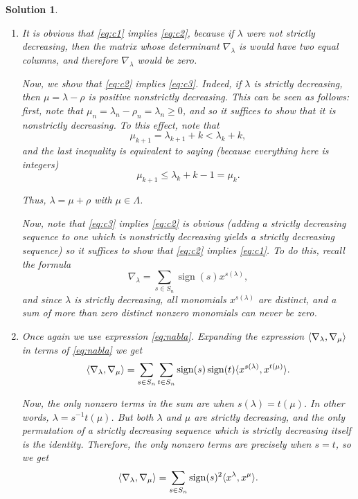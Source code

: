 \documentclass{article}
\theoremstyle{nonumberplain}
\newtheorem{sol}{Solution}
\DeclareMathOperator{\sign}{sign}
\DeclarePairedDelimiter{\braket}{\langle}{\rangle}
\begin{document}
\begin{sol}
\leavevmode
\begin{enumerate}
\item It is obvious that \eqref{eq:c1} implies \eqref{eq:c2}, because if $\lambda$ were not strictly decreasing, then the matrix whose determinant $\nabla_\lambda$ is would have two equal columns, and therefore $\nabla_\lambda$ would be zero.

Now, we show that \eqref{eq:c2} implies \eqref{eq:c3}. Indeed, if $\lambda$ is strictly decreasing, then $\mu = \lambda - \rho$ is positive nonstrictly decreasing. This can be seen as follows: first, note that $\mu_n = \lambda_n - \rho_n = \lambda_n \geq 0$, and so it suffices to show that it is nonstrictly decreasing. To this effect, note that
\begin{equation}
\mu_{k+1} = \lambda_{k+1} + k < \lambda_k + k,
\end{equation}
and the last inequality is equivalent to saying (because everything here is integers)
\begin{equation}
\mu_{k+1} \leq \lambda_k + k - 1 = \mu_k.
\end{equation}

Thus, $\lambda = \mu + \rho$ with $\mu \in \Lambda$.

Now, note that \eqref{eq:c3} implies \eqref{eq:c2} is obvious (adding a strictly decreasing sequence to one which is nonstrictly decreasing yields a strictly decreasing sequence) so it suffices to show that \eqref{eq:c2} implies \eqref{eq:c1}. To do this, recall the formula
\begin{equation}\label{eq:nabla}
\nabla_\lambda = \sum_{s \in S_n} \sign(s) x^{s(\lambda)},
\end{equation}
and since $\lambda$ is strictly decreasing, all monomials $x^{s(\lambda)}$ are distinct, and a sum of more than zero distinct nonzero monomials can never be zero.

\item Once again we use expression \eqref{eq:nabla}. Expanding the expression $\braket{\nabla_\lambda, \nabla_\mu}$ in terms of \eqref{eq:nabla} we get
\begin{equation}
\braket{\nabla_\lambda, \nabla_\mu} = \sum_{s \in S_n} \sum_{t \in S_n} \sign(s) \sign(t) \braket{x^{s(\lambda)}, x^{t(\mu)}}.
\end{equation}

Now, the only nonzero terms in the sum are when $s(\lambda) = t(\mu)$. In other words, $\lambda = s^{-1} t(\mu)$. But both $\lambda$ and $\mu$ are strictly decreasing, and the only permutation of a strictly decreasing sequence which is strictly decreasing itself is the identity. Therefore, the only nonzero terms are precisely when $s = t$, so we get
\begin{equation}
\braket{\nabla_\lambda, \nabla_\mu} = \sum_{s \in S_n} \sign(s)^2 \braket{x^{\lambda}, x^{\mu}}.
\end{equation}


\end{enumerate}
\end{sol}
\end{document}
